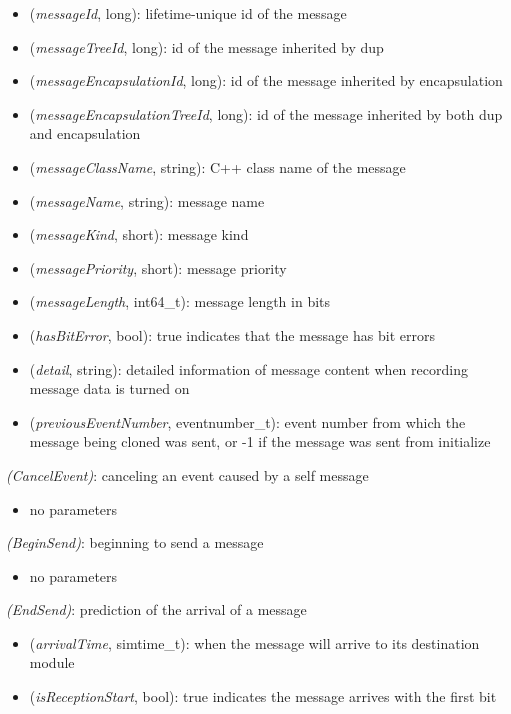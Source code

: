 \begin{itemize}
  \item {} (\textit{messageId}, long): lifetime-unique id of the message
  \item {} (\textit{messageTreeId}, long): id of the message inherited by dup
  \item {} (\textit{messageEncapsulationId}, long): id of the message inherited by encapsulation
  \item {} (\textit{messageEncapsulationTreeId}, long): id of the message inherited by both dup and encapsulation
  \item {} (\textit{messageClassName}, string): C++ class name of the message
  \item {} (\textit{messageName}, string): message name
  \item {} (\textit{messageKind}, short): message kind
  \item {} (\textit{messagePriority}, short): message priority
  \item {} (\textit{messageLength}, int64\_t): message length in bits
  \item {} (\textit{hasBitError}, bool): true indicates that the message has bit errors
  \item {} (\textit{detail}, string): detailed information of message content when recording message data is turned on
  \item {} (\textit{previousEventNumber}, eventnumber\_t): event number from which the message being cloned was sent, or -1 if the message was sent from initialize
\end{itemize}

 \textit{(CancelEvent)}: canceling an event caused by a self message

\begin{itemize}
  \item no parameters
\end{itemize}

 \textit{(BeginSend)}: beginning to send a message

\begin{itemize}
  \item no parameters
\end{itemize}

 \textit{(EndSend)}: prediction of the arrival of a message

\begin{itemize}
  \item {} (\textit{arrivalTime}, simtime\_t): when the message will arrive to its destination module
  \item {} (\textit{isReceptionStart}, bool): true indicates the message arrives with the first bit
\end{itemize}

